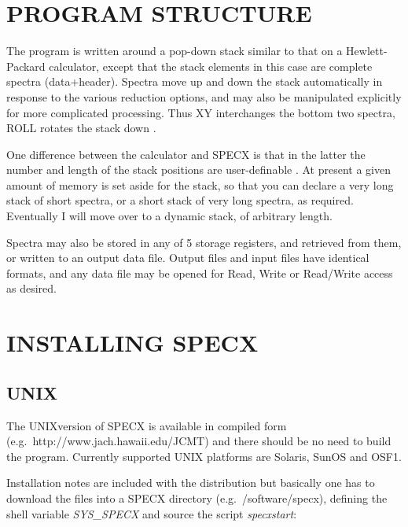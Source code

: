 \documentclass[11pt,twoside]{report}
\begin{document}
\section{PROGRAM STRUCTURE}

The program is written around a pop-down stack similar to
that on a Hewlett-Packard
calculator, except that the stack
elements in this case are complete spectra (data+header). Spectra move
up and down the stack automatically in response to the various
reduction options, and may also be manipulated explicitly for more
complicated processing. Thus XY interchanges the
bottom two spectra, ROLL rotates the stack down
\etc.

One difference between the calculator and SPECX is that in the latter
the number and length of the stack positions are user-definable
. At present a given amount of memory is set 
aside for the stack, so that you can declare a very long stack of
short spectra, or a short stack of very long spectra, as
required. Eventually I will move over to a dynamic stack, of arbitrary
length.

Spectra may also be stored in any of 5 storage registers, and retrieved from them, or written to an output data file. Output
files and input files have identical formats, and any data file may be opened
for Read, Write or Read/Write access as desired. 

\section{INSTALLING SPECX}

\subsection{UNIX}

The UNIXversion of SPECX is available in compiled form 
(e.g.\ http://www.jach.hawaii.edu/JCMT) and there should be no need
to build the program. Currently supported UNIX platforms are
Solaris, SunOS and OSF1.

Installation notes are included with the distribution but basically
one has to download the files into a SPECX directory (e.g.\
/software/specx), defining the shell variable {\em SYS\_SPECX} and
source the script {\em specxstart}\index{startup file}:
\end{document}
